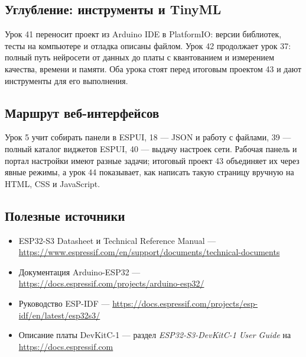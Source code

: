 \subsection*{Углубление: инструменты и TinyML}
Урок 41 переносит проект из Arduino IDE в PlatformIO: версии библиотек, тесты на компьютере и
отладка описаны файлом. Урок 42 продолжает урок 37: полный путь нейросети от данных до платы
с квантованием и измерением качества, времени и памяти. Оба урока стоят перед итоговым проектом 43
и дают инструменты для его выполнения.

\subsection*{Маршрут веб-интерфейсов}
Урок 5 учит собирать панели в ESPUI, 18 --- JSON и работу с файлами,
39 --- полный каталог виджетов ESPUI, 40 --- выдачу настроек сети. Рабочая панель и портал настройки
имеют разные задачи; итоговый проект 43 объединяет их через явные режимы, а урок 44 показывает, как написать такую страницу вручную на HTML, CSS и JavaScript.

\subsection*{Полезные источники}
\begin{itemize}
  \item ESP32-S3 Datasheet и Technical Reference Manual --- \url{https://www.espressif.com/en/support/documents/technical-documents}
  \item Документация Arduino-ESP32 --- \url{https://docs.espressif.com/projects/arduino-esp32/}
  \item Руководство ESP-IDF --- \url{https://docs.espressif.com/projects/esp-idf/en/latest/esp32s3/}
  \item Описание платы DevKitC-1 --- раздел \emph{ESP32-S3-DevKitC-1 User Guide} на \url{https://docs.espressif.com}
\end{itemize}
